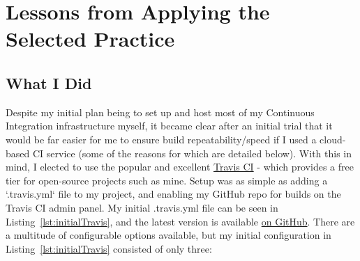 \section{Lessons from Applying the Selected Practice}
\label{sec:Lessons from Applying the Selected Practice}

\subsection{What I Did}
\label{sub:What I Did}


Despite my initial plan being to set up and host most of my Continuous
Integration infrastructure myself, it became clear after an initial trial
that it would be far easier for me to ensure build repeatability/speed if I used
a cloud-based CI service (some of the reasons for which are detailed below).
With this in mind, I elected to use the popular and
excellent \href{https://travis-ci.org/}{Travis CI} - which provides a free tier
for open-source projects such as mine. Setup was as simple as adding a
`.travis.yml` file to my project, and enabling my GitHub repo for builds on
the Travis CI admin panel. My initial .travis.yml file can be seen in
Listing~\ref{lst:initialTravis}, and the latest version is available
\href{https://github.com/FireEater64/gamq/blob/master/.travis.yml}{on GitHub}.
There are a multitude of configurable options available, but
my initial configuration in Listing~\ref{lst:initialTravis} consisted of
only three:

